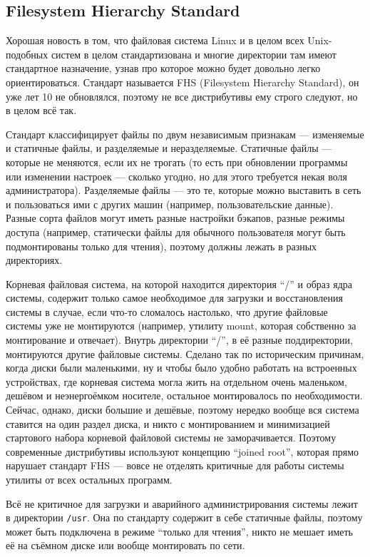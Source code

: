 \documentclass{../../text-style}
\begin{document}
\subsection{Filesystem Hierarchy Standard}

Хорошая новость в том, что файловая система Linux и в целом всех Unix-подобных систем в целом стандартизована и многие директории там имеют стандартное назначение, узнав про которое можно будет довольно легко ориентироваться.
Стандарт называется FHS (Filesystem Hierarchy Standard), он уже лет 10 не обновлялся, поэтому не все дистрибутивы ему строго следуют, но в целом всё так.

Стандарт классифицирует файлы по двум независимым признакам --- изменяемые и статичные файлы, и разделяемые и неразделяемые.
Статичные файлы --- которые не меняются, если их не трогать (то есть при обновлении программы или изменении настроек --- сколько угодно, но для этого требуется некая воля администратора).
Разделяемые файлы --- это те, которые можно выставить в сеть и пользоваться ими с других машин (например, пользовательские данные).
Разные сорта файлов могут иметь разные настройки бэкапов, разные режимы доступа (например, статически файлы для обычного пользователя могут быть подмонтированы только для чтения), поэтому должны лежать в разных директориях.

Корневая файловая система, на которой находится директория \enquote{/} и образ ядра системы, содержит только самое необходимое для загрузки и восстановления системы в случае, если что-то сломалось настолько, что другие файловые системы уже не монтируются (например, утилиту mount, которая собственно за монтирование и отвечает).
Внутрь директории \enquote{/}, в её разные поддиректории, монтируются другие файловые системы.
Сделано так по историческим причинам, когда диски были маленькими, ну и чтобы было удобно работать на встроенных устройствах, где корневая система могла жить на отдельном очень маленьком, дешёвом и неэнергоёмком носителе, остальное монтировалось по необходимости.
Сейчас, однако, диски большие и дешёвые, поэтому нередко вообще вся система ставится на один раздел диска, и никто с монтированием и минимизацией стартового набора корневой файловой системы не заморачивается.
Поэтому современные дистрибутивы используют концепцию \enquote{joined root}, которая прямо нарушает стандарт FHS --- вовсе не отделять критичные для работы системы утилиты от всех остальных программ.

Всё не критичное для загрузки и аварийного администрирования системы лежит в директории \verb|/usr|.
Она по стандарту содержит в себе статичные файлы, поэтому может быть подключена в режиме \enquote{только для чтения}, никто не мешает иметь её на съёмном диске или вообще монтировать по сети.
\end{document}
